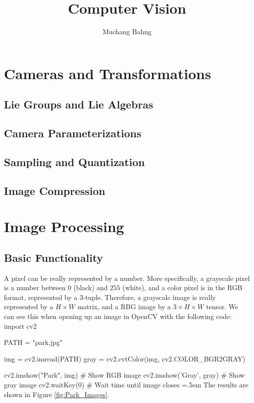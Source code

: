 \documentclass{article}
\newenvironment{cverbatim}
 {\SaveVerbatim{cverb}}
 {\endSaveVerbatim
  \flushleft\fboxrule=0pt\fboxsep=.5em
  \colorbox{cverbbg}{%
    \makebox[\dimexpr\linewidth-2\fboxsep][l]{\BUseVerbatim{cverb}}%
  }
  \endflushleft
}
\theoremstyle{definition}
\theoremstyle{remark}
\theoremstyle{definition}
\begin{document}
\pagestyle{fancy}

\cfoot{\thepage / \pageref{LastPage}}

\title{Computer Vision}
\author{Muchang Bahng}

\maketitle

\tableofcontents

\pagebreak


\section{Cameras and Transformations}

\subsection{Lie Groups and Lie Algebras}

\subsection{Camera Parameterizations}

\subsection{Sampling and Quantization}

\subsection{Image Compression}


\section{Image Processing}

\subsection{Basic Functionality}

A pixel can be really represented by a number. More specifically, a grayscale pixel is a number between $0$ (black) and $255$ (white), and a color pixel is in the RGB format, represented by a $3$-tuple. Therefore, a grayscale image is really represented by a $H \times W$ matrix, and a RBG image by a $3 \times H \times W$ tensor. We can see this when opening up an image in OpenCV with the following code: 
\begin{cverbatim}
import cv2 

PATH = "park.jpg"

img = cv2.imread(PATH)
gray = cv2.cvtColor(img, cv2.COLOR_BGR2GRAY) 

cv2.imshow("Park", img)     # Show RGB image
cv2.imshow('Gray', gray)    # Show gray image
cv2.waitKey(0)              # Wait time until image closes
\end{cverbatim}
The results are shown in Figure \ref{fig:Park_Images}. 
\end{document}
